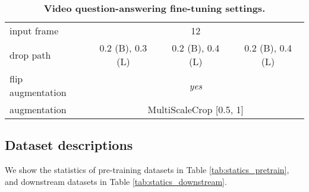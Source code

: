 \documentclass[10pt,twocolumn,letterpaper]{article}
\begin{document}
\begin{table}[t!]
{\begin{tabular}{l|ccc}
        input frame & \multicolumn{3}{c}{12} \\
        drop path \cite{droppath} & 0.2 (B), 0.3 (L) & 0.2 (B), 0.4 (L) & 0.2 (B), 0.4 (L) \\
        flip augmentation & \multicolumn{3}{c}{\textit{yes}} \\
        augmentation & \multicolumn{3}{c}{MultiScaleCrop [0.5, 1]} \\
        \end{tabular}
    }
    \vspace{-0.3cm}
    \caption{
        \textbf{Video question-answering fine-tuning settings.}
    }
    \label{tab:qa_hyperparameters} 
\end{table} \begin{table}[t!]
    \centering
    \setlength\tabcolsep{3.5pt}
    \vspace{-0.3cm}
    \caption{
        \textbf{Multi-choice video question-answering fine-tuning settings.}
    }
    \label{tab:mc_hyperparameters} 
\end{table} 
\subsection{Dataset descriptions}
We show the statistics of pre-training datasets in Table \ref{tab:statics_pretrain},
and downstream datasets in Table \ref{tab:statics_downstream}.
\end{document}
